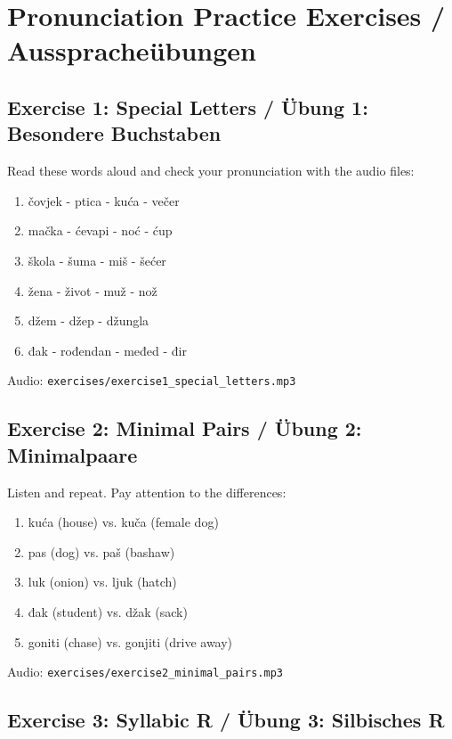 \section{Pronunciation Practice Exercises / Ausspracheübungen}

\subsection{Exercise 1: Special Letters / Übung 1: Besondere Buchstaben}

Read these words aloud and check your pronunciation with the audio files:

\begin{enumerate}
    \item čovjek - ptica - kuća - večer
    \item mačka - ćevapi - noć - ćup
    \item škola - šuma - miš - šećer
    \item žena - život - muž - nož
    \item džem - džep - džungla
    \item đak - rođendan - međed - đir
\end{enumerate}

Audio: \texttt{exercises/exercise1\_special\_letters.mp3}

\subsection{Exercise 2: Minimal Pairs / Übung 2: Minimalpaare}

Listen and repeat. Pay attention to the differences:

\begin{enumerate}
    \item kuća (house) vs. kuča (female dog)
    \item pas (dog) vs. paš (bashaw)
    \item luk (onion) vs. ljuk (hatch)
    \item đak (student) vs. džak (sack)
    \item goniti (chase) vs. gonjiti (drive away)
\end{enumerate}

Audio: \texttt{exercises/exercise2\_minimal\_pairs.mp3}

\subsection{Exercise 3: Syllabic R / Übung 3: Silbisches R}

